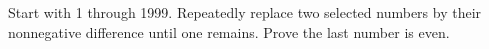 Start with 1 through 1999. Repeatedly replace two selected numbers by their nonnegative difference until one remains. Prove the last number is even.
